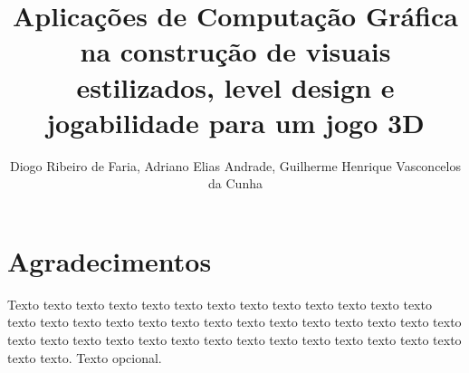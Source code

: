 \documentclass[a4paper,12pt,twoside,english,brazilian]{book}
\title{Aplicações de Computação Gráfica na construção de visuais estilizados, level design e jogabilidade para um jogo 3D}
\author{Diogo Ribeiro de Faria, Adriano Elias Andrade, Guilherme Henrique Vasconcelos da Cunha}
\begin{document}
\frontmatter

\pagestyle{plain}

\onehalfspacing %

\maketitle

\begin{dedicatoria}

\end{dedicatoria}


\chapter*{Agradecimentos}

Texto texto texto texto texto texto texto texto texto texto texto texto texto
texto texto texto texto texto texto texto texto texto texto texto texto texto
texto texto texto texto texto texto texto texto texto texto texto texto texto
texto texto texto texto. Texto opcional.



\tableofcontents


\mainmatter

\pagestyle{mainmatter}

\singlespacing

\pagestyle{unnumberedchapter}







\pagestyle{mainmatter}

\backmatter

\pagestyle{backmatter}


\printbibliography[
  title=\refname\label{sec:bib},
  heading=bibintoc,
]

\printindex
\end{document}
